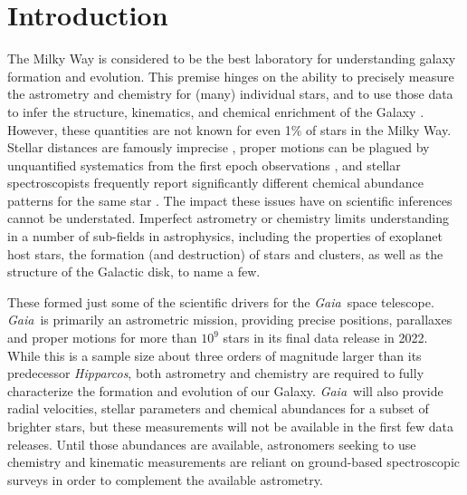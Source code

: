 \documentclass[preprint,trackchanges]{aastex}
\newcommand{\project}[1]{\textsl{#1}}
\newcommand{\gaia}{\project{Gaia}}
\newcommand{\hipparcos}{\project{Hipparcos}}
\begin{document}
\keywords{}

\section{Introduction} 
\label{sec:introduction}

The Milky Way is considered to be the best laboratory for understanding galaxy
formation and evolution.  This premise hinges on the ability to precisely measure 
the astrometry and chemistry for (many) individual stars, and to use those data 
to infer the structure, kinematics, and chemical enrichment of the Galaxy 
\citep[e.g.,][]{Schlaufman_2009,Deason_2011,Ness_2012,Ness_2013a,Ness_2013b,
Casey_2012,Casey_2013,Casey_2014a,Casey_2014b,Bovy_2016}.  However, these 
quantities are not known for even 1\% of stars in the Milky Way.  Stellar 
distances are famously imprecise \citep[e.g.,][]{van_Leeuwen_2007,Jofre_2015,
Madler_2016}, proper motions can be plagued by unquantified systematics from 
the first epoch observations \citep[e.g.,][]{Casey_Schlaufman_2015}, and 
stellar spectroscopists frequently report significantly different chemical 
abundance patterns for the same star \citep{Smiljanic_2014}.  The impact 
these issues have on scientific inferences cannot be understated.  Imperfect 
astrometry or chemistry limits understanding in a number of sub-fields in
astrophysics, including the properties of exoplanet host stars, the formation 
(and destruction) of stars and clusters, as well as the structure of the 
Galactic disk, to name a few.


These formed just some of the scientific drivers for the \gaia\ space telescope.
\gaia\ is primarily an astrometric mission, providing precise positions,
parallaxes and proper motions for more than $10^9$ stars in its final data
release in 2022.  While this is a sample size about three orders of magnitude 
larger than its predecessor \hipparcos, both astrometry and chemistry are 
required to fully characterize the formation and evolution of our Galaxy. 
\gaia\ will also provide radial velocities, stellar parameters and chemical 
abundances for a subset of brighter stars, but these measurements will not be 
available in the first few data releases. Until those abundances are available,
astronomers seeking to use chemistry and kinematic measurements are reliant on 
ground-based spectroscopic surveys in order to complement the available astrometry.
\end{document}
